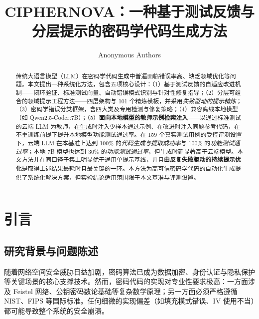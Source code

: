 \documentclass[12pt]{llncs}
\begin{document}
\title{CIPHERNOVA：一种基于测试反馈与分层提示的密码学代码生成方法}

\newif\ifanonymized
\anonymizedtrue      %

\ifanonymized
\author{Anonymous Authors}
\else
\author{Jia-Yi He\inst{1} \and Xiao Lan\thanks{Corresponding author: lanxiao@scu.edu.cn}}
\institute{School of Cyber Science and Engineering, Sichuan University, Chengdu, Sichuan, China\\
\email{2022141500268@stu.scu.edu.cn, lanxiao@scu.edu.cn}}
\authorrunning{J.\ He and X.\ Lan}
\fi
\maketitle

\begin{abstract}
传统大语言模型（LLM）在密码学代码生成中普遍面临错误率高、缺乏领域优化等问题。本文提出一种系统化方法，包含五项核心设计：（1）基于测试反馈的自适应改进机制——闭环验证、标准测试向量、自动错误模式识别与针对性修复指导；（2）分层可组合的领域提示工程方法——四层架构与 101 个精炼模板，并采用\emph{失败驱动的提示精炼}；（3）密码学错误分类框架，含四大类及专用检测与修复策略；（4）兼容离线本地模型（如 Qwen2.5-Coder:7B）；（5）\textbf{面向本地模型的教师示例检索注入}——以通过标准测试的云端 LLM 为教师，在生成时注入少样本通过示例、在改进时注入同题参考代码，在不重训练前提下提升本地模型功能测试通过率。在 159 个真实测试用例的受控评测设置下，云端 LLM 在本基准上达到 100\% 的\emph{代码生成与提取成功率}与 100\% 的\emph{功能测试通过率}；本地 7B 模型也达到 30\% 的\emph{功能测试通过率}，但生成时延显著高于云端模型。本文方法并在同口径子集上明显优于通用单提示基线，并且\textbf{由反复失败驱动的持续提示优化}是取得上述结果最耗时且最关键的一环。本方法为高可信密码学代码的自动化生成提供了系统化解决方案，但实验结论适用范围限于本文基准与评测设置。
\end{abstract}


\section{引言}
\subsection{研究背景与问题陈述}
随着网络空间安全威胁日益加剧，密码算法已成为数据加密、身份认证与隐私保护等关键场景的核心支撑技术。然而，密码代码的实现对专业性要求极高：一方面涉及 Feistel 网络、公钥密码数论基础等复杂数学原理；另一方面必须严格遵循 NIST、FIPS 等国际标准。任何细微的实现偏差（如填充模式错误、IV 使用不当）都可能导致整个系统的安全崩溃。
\end{document}
